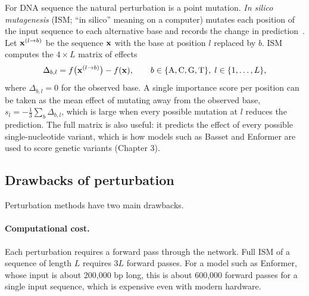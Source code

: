 For DNA sequence the natural perturbation is a point mutation. \emph{In silico mutagenesis} (ISM; ``in silico'' meaning on a computer) mutates each position of the input sequence to each alternative base and records the change in prediction~\citep{alipanahi2015,zhou2015}. Let $\mathbf{x}^{(l\to b)}$ be the sequence $\mathbf{x}$ with the base at position $l$ replaced by $b$. ISM computes the $4\times L$ matrix of effects
\begin{equation}
  \Delta_{b,l} = f\big(\mathbf{x}^{(l\to b)}\big) - f(\mathbf{x}), \qquad b\in\{\mathrm{A},\mathrm{C},\mathrm{G},\mathrm{T}\},\; l\in\{1,\dots,L\},
  \label{eq:ism}
\end{equation}
where $\Delta_{b,l}=0$ for the observed base. A single importance score per position can be taken as the mean effect of mutating away from the observed base, $s_l = -\frac{1}{3}\sum_{b}\Delta_{b,l}$, which is large when every possible mutation at $l$ reduces the prediction. The full matrix is also useful: it predicts the effect of every possible single-nucleotide variant, which is how models such as Basset and Enformer are used to score genetic variants (Chapter 3).

\subsection{Drawbacks of perturbation}

Perturbation methods have two main drawbacks.

\paragraph{Computational cost.} Each perturbation requires a forward pass through the network. Full ISM of a sequence of length $L$ requires $3L$ forward passes. For a model such as Enformer, whose input is about 200,000 bp long, this is about 600,000 forward passes for a single input sequence, which is expensive even with modern hardware.

